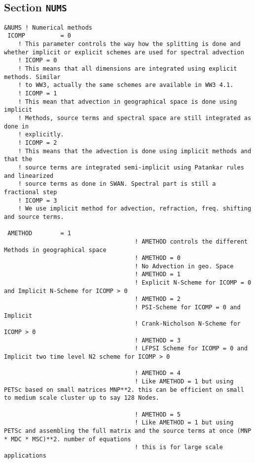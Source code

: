 \documentclass[12pt]{amsart}
\begin{document}
\subsection{Section {\tt NUMS}}
\begin{verbatim}
&NUMS ! Numerical methods
 ICOMP          = 0
    ! This parameter controls the way how the splitting is done and whether implicit or explicit schemes are used for spectral advection
    ! ICOMP = 0
    ! This means that all dimensions are integrated using explicit methods. Similar
    ! to WW3, actually the same schemes are available in WW3 4.1.
    ! ICOMP = 1
    ! This mean that advection in geographical space is done using implicit
    ! Methods, source terms and spectral space are still integrated as done in
    ! explicitly.
    ! ICOMP = 2
    ! This means that the advection is done using implicit methods and that the
    ! source terms are integrated semi-implicit using Patankar rules and linearized
    ! source terms as done in SWAN. Spectral part is still a fractional step
    ! ICOMP = 3
    ! We use implicit method for advection, refraction, freq. shifting and source terms.

 AMETHOD        = 1
                                     ! AMETHOD controls the different Methods in geographical space
                                     ! AMETHOD = 0
                                     ! No Advection in geo. Space
                                     ! AMETHOD = 1
                                     ! Explicit N-Scheme for ICOMP = 0 and Implicit N-Scheme for ICOMP > 0
                                     ! AMETHOD = 2
                                     ! PSI-Scheme for ICOMP = 0 and Implicit
                                     ! Crank-Nicholson N-Scheme for ICOMP > 0
                                     ! AMETHOD = 3
                                     ! LFPSI Scheme for ICOMP = 0 and Implicit two time level N2 scheme for ICOMP > 0

                                     ! AMETHOD = 4
                                     ! Like AMETHOD = 1 but using PETSc based on small matrices MNP**2. this can be efficient on small to medium scale cluster up to say 128 Nodes.

                                     ! AMETHOD = 5
                                     ! Like AMETHOD = 1 but using PETSc and assembling the full matrix and the source terms at once (MNP * MDC * MSC)**2. number of equations
                                     ! this is for large scale applications


\end{verbatim}
\end{document}
